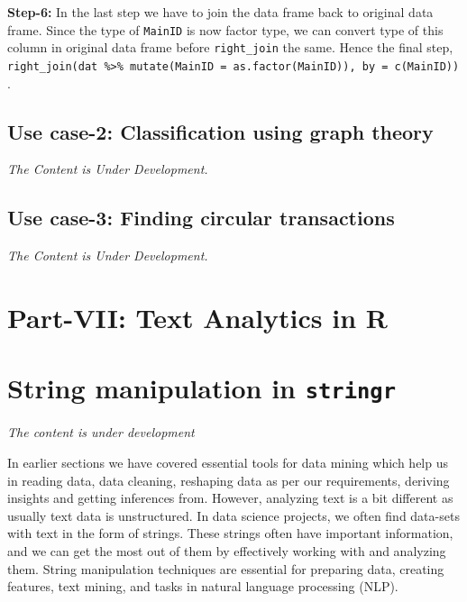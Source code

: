 \documentclass[
]{book}
\begin{document}
\textbf{Step-6:} In the last step we have to join the data frame back to original data frame. Since the type of \texttt{MainID} is now factor type, we can convert type of this column in original data frame before \texttt{right\_join} the same. Hence the final step, \texttt{right\_join(dat\ \%\textgreater{}\%\ mutate(MainID\ =\ as.factor(MainID)),\ by\ =\ c(\textquotesingle{}MainID\textquotesingle{}))}.

\hypertarget{use-case-2-classification-using-graph-theory}{%
\section{Use case-2: Classification using graph theory}\label{use-case-2-classification-using-graph-theory}}

\emph{The Content is Under Development.}

\hypertarget{use-case-3-finding-circular-transactions}{%
\section{Use case-3: Finding circular transactions}\label{use-case-3-finding-circular-transactions}}

\emph{The Content is Under Development.}

\hypertarget{part-vii-text-analytics-in-r}{%
\chapter*{Part-VII: Text Analytics in R}\label{part-vii-text-analytics-in-r}}

\hypertarget{string-manipulation-in-stringr}{%
\chapter{\texorpdfstring{String manipulation in \texttt{stringr}}{String manipulation in stringr}}\label{string-manipulation-in-stringr}}

\emph{The content is under development}

In earlier sections we have covered essential tools for data mining which help us in reading data, data cleaning, reshaping data as per our requirements, deriving insights and getting inferences from. However, analyzing text is a bit different as usually text data is unstructured. In data science projects, we often find data-sets with text in the form of strings. These strings often have important information, and we can get the most out of them by effectively working with and analyzing them. String manipulation techniques are essential for preparing data, creating features, text mining, and tasks in natural language processing (NLP).
\end{document}
